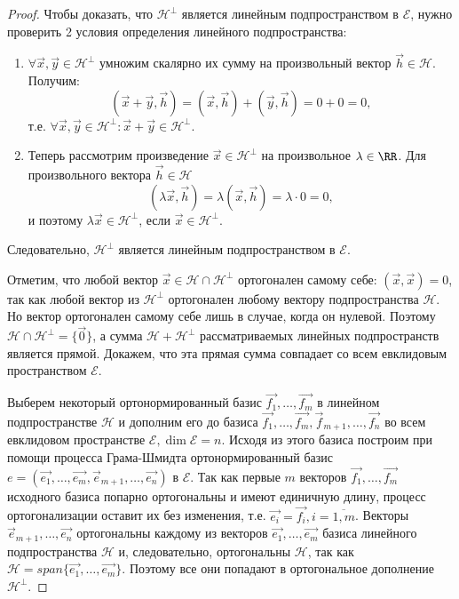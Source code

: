 \begin{proof}
    Чтобы доказать, что $\mathcal{H}^\perp$ является линейным подпространством в $\mathcal{E}$, нужно проверить 2 условия определения линейного подпространства:
    \begin{enumerate}
        \item $\forall \vec{x}, \vec{y} \in \mathcal{H}^\perp$ умножим скалярно их сумму на произвольный вектор $\vec{h} \in \mathcal{H}$. Получим:
        $$(\vec{x} + \vec{y}, \vec{h}) = (\vec{x}, \vec{h}) + (\vec{y}, \vec{h}) = 0 + 0 = 0,$$
        т.е. $\forall \vec{x}, \vec{y} \in \mathcal{H}^\perp \colon \vec{x} + \vec{y} \in \mathcal{H}^\perp$. 
        \item Теперь рассмотрим произведение $\vec{x} \in \mathcal{H}^\perp$ на произвольное $\lambda \in \RR$. Для произвольного вектора $\vec{h} \in \mathcal{H}$
        $$(\lambda \vec{x}, \vec{h}) = \lambda(\vec{x}, \vec{h}) = \lambda \cdot 0 = 0,$$
        и поэтому $\lambda \vec{x} \in \mathcal{H}^\perp$, если $\vec{x} \in \mathcal{H}^\perp$.
    \end{enumerate}
    Следовательно, $\mathcal{H}^\perp$ является линейным подпространством в $\mathcal{E}$.

    Отметим, что любой вектор $\vec{x} \in \mathcal{H} \cap \mathcal{H}^\perp$ ортогонален самому себе: $(\vec{x}, \vec{x}) = 0$, так как любой вектор из $\mathcal{H}^\perp$ ортогонален любому вектору подпространства $\mathcal{H}$. Но вектор ортогонален самому себе лишь в случае, когда он нулевой. Поэтому $\mathcal{H} \cap \mathcal{H}^\perp = \{\vec{0}\}$, а сумма $\mathcal{H} + \mathcal{H}^\perp$ рассматриваемых линейных подпространств является прямой. Докажем, что эта прямая сумма совпадает со всем евклидовым пространством $\mathcal{E}$.

    Выберем некоторый ортонормированный базис $\vec{f_1}, \ldots, \vec{f_m}$ в линейном подпространстве $\mathcal{H}$ и дополним его до базиса $\vec{f_1}, \ldots, \vec{f_m}, \vec{f}_{m + 1}, \ldots, \vec{f_n}$ во всем евклидовом пространстве $\mathcal{E}, \dim \mathcal{E} = n$. Исходя из этого базиса построим при помощи процесса Грама-Шмидта ортонормированный базис $e = (\vec{e_1}, \ldots, \vec{e_m}, \vec{e}_{m + 1}, \ldots, \vec{e_n})$ в $\mathcal{E}$. Так как первые $m$ векторов $\vec{f_1}, \ldots, \vec{f_m}$ исходного базиса попарно ортогональны и имеют единичную длину, процесс ортогонализации оставит их без изменения, т.е. $\vec{e_i} = \vec{f_i}, i = \overline{1, m}$. Векторы $\vec{e}_{m + 1}, \ldots, \vec{e_n}$ ортогональны каждому из векторов $\vec{e_1}, \ldots, \vec{e_m}$ базиса линейного подпространства $\mathcal{H}$ и, следовательно, ортогональны $\mathcal{H}$, так как $\mathcal{H} = span\{\vec{e_1}, \ldots, \vec{e_m}\}$. Поэтому все они попадают в ортогональное дополнение $\mathcal{H}^\perp$.


\end{proof}
